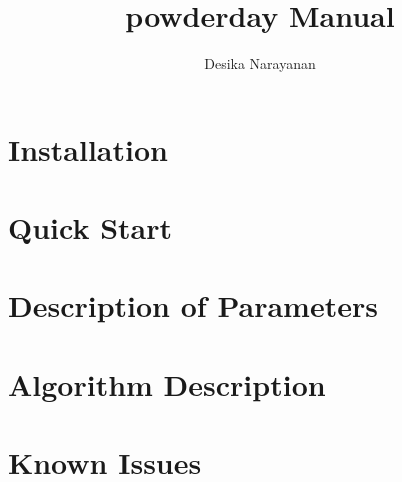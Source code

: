 \documentclass[11pt,letterpaper,notitlepage]{classnotes}
\author{Desika Narayanan}
\title{{\sc powderday} Manual}
\newcommand{\pd}{{\sc powderday}}
\numberwithin{equation}{section}
\numberwithin{exercise}{section}
\numberwithin{figure}{section}
\begin{document}
\maketitle
\thispagestyle{empty}

\begin{center}

\vskip1cm

\end{center}


\newpage

\tableofcontents

\newpage
\chapter{Installation}



\chapter{Quick Start}


\chapter{Description of Parameters}

\chapter{Algorithm Description}

\chapter{Known Issues}
%
\end{document}
